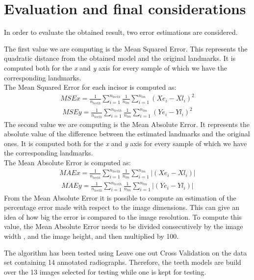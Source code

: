 \documentclass[a4paper]{article}
\begin{document}
\section{Evaluation and final considerations}\label{sec:evaluation}
In order to evaluate the obtained result, two error estimations are considered.

The first value we are computing is the Mean Squared Error. This represents the quadratic distance from the obtained model and the original landmarks. It is computed both for the \textit{x} and \textit{y} axis for every sample of which we have the corresponding landmarks. \\
The Mean Squared Error for each incisor is computed as: 
\begin{align}
   MSEx = \frac{1}{n_{teeth}} \sum_{i=1}^{n_{teeth}} \frac{1}{n_{lm}} \sum_{i=1}^{n_{lm}}(Xe_i - Xl_i)^2
\end{align}
\begin{align}
   MSEy = \frac{1}{n_{teeth}} \sum_{i=1}^{n_{teeth}} \frac{1}{n_{lm}} \sum_{i=1}^{n_{lm}}(Ye_i - Yl_i)^2
\end{align}
The second value we are computing is the Mean Absolute Error. It represents the absolute value of the difference between the estimated landmarks and the original ones. It is computed both for the \textit{x} and \textit{y} axis for every sample of which we have the corresponding landmarks. \\
The Mean Absolute Error is computed as: 
\begin{align}
    MAEx = \frac{1}{n_{teeth}} \sum_{i=1}^{n_{teeth}} \frac{1}{n_{lm}} \sum_{i=1}^{n_{lm}}|(Xe_i - Xl_i)|
\end{align}
\begin{align}
    MAEy = \frac{1}{n_{teeth}} \sum_{i=1}^{n_{teeth}} \frac{1}{n_{lm}} \sum_{i=1}^{n_{lm}}|(Ye_i - Yl_i)|
\end{align}
From the Mean Absolute Error it is possible to compute an estimation of the percentage error made with respect to the image dimensions. This can give an idea of how big the error is compared to the image resolution. 
To compute this value, the Mean Absolute Error needs to be divided consecutively by the image width , and the image height, and then multiplied by 100.

The algorithm has been tested using Leave one out Cross Validation on the data set containing 14 annotated radiographs. Therefore, the teeth models are build over the 13 images selected for testing while one is kept for testing. 
\end{document}
